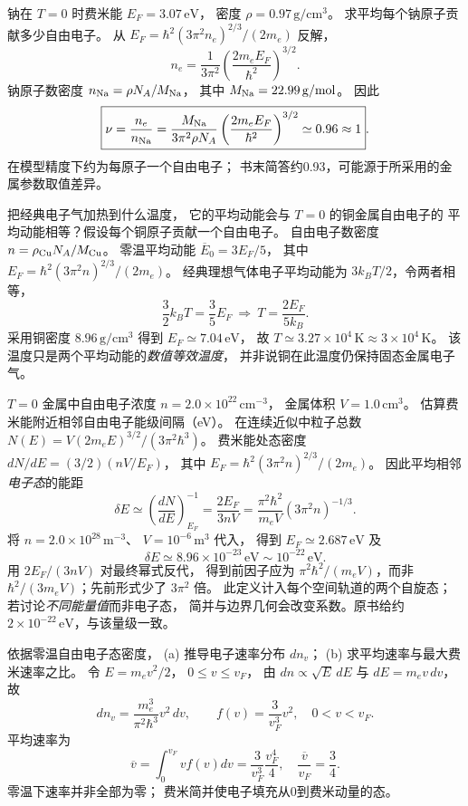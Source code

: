 钠在 $T=0$ 时费米能
$E_F=3.07\,\mathrm{eV}$，
密度 $\rho=0.97\,\mathrm{g/cm^3}$。
求平均每个钠原子贡献多少自由电子。
\exsolution
从
$E_F=\hbar^2(3\pi^2n_e)^{2/3}/(2m_e)$ 反解，
\[
 n_e=\frac1{3\pi^2}
 \left(\frac{2m_eE_F}{\hbar^2}\right)^{3/2}.
\]
钠原子数密度
$n_{\rm Na}=\rho N_A/M_{\rm Na}$，
其中 $M_{\rm Na}=22.99\,\mathrm{g/mol}$。
因此
\[
 \boxed{\nu=\frac{n_e}{n_{\rm Na}}
 =\frac{M_{\rm Na}}{3\pi^2\rho N_A}
 \left(\frac{2m_eE_F}{\hbar^2}\right)^{3/2}
 \simeq0.96\approx1}.
\]
\excheck 在模型精度下约为每原子一个自由电子；
书末简答约0.93，可能源于所采用的金属参数取值差异。

把经典电子气加热到什么温度，
它的平均动能会与 $T=0$ 的铜金属自由电子的
平均动能相等？假设每个铜原子贡献一个自由电子。
\exsolution
自由电子数密度
$n=\rho_{\rm Cu}N_A/M_{\rm Cu}$。
零温平均动能 $\overline E_0=3E_F/5$，
其中
$E_F=\hbar^2(3\pi^2n)^{2/3}/(2m_e)$。
经典理想气体电子平均动能为
$3k_BT/2$，令两者相等，
\[
 \frac32k_BT=\frac35E_F
 \ \Longrightarrow\
 \boxed{T=\frac{2E_F}{5k_B}}.
\]
采用铜密度 $8.96\,\mathrm{g/cm^3}$
得到 $E_F\simeq7.04\,\mathrm{eV}$，
故
$\boxed{T\simeq3.27\times10^4\,\mathrm K
 \approx3\times10^4\,\mathrm K}$。
\excheck 该温度只是两个平均动能的\emph{数值等效温度}，
并非说铜在此温度仍保持固态金属电子气。

$T=0$ 金属中自由电子浓度
$n=2.0\times10^{22}\,\mathrm{cm^{-3}}$，
金属体积 $V=1.0\,\mathrm{cm^3}$。
估算费米能附近相邻自由电子能级间隔（eV）。
\exsolution
在连续近似中粒子总数
$N(E)=V(2m_eE)^{3/2}/(3\pi^2\hbar^3)$。
费米能处态密度
$dN/dE=(3/2)(nV/E_F)$，
其中
$E_F=\hbar^2(3\pi^2n)^{2/3}/(2m_e)$。
因此平均相邻\emph{电子态}的能距
\[
 \boxed{\delta E\simeq
 \left(\frac{dN}{dE}\right)^{-1}_{E_F}
 =\frac{2E_F}{3nV}
 =\frac{\pi^2\hbar^2}{m_eV}(3\pi^2n)^{-1/3}}.
\]
将 $n=2.0\times10^{28}\,\mathrm{m^{-3}}$、
$V=10^{-6}\,\mathrm{m^3}$ 代入，
得到 $E_F\simeq2.687\,\mathrm{eV}$ 及
\[
\boxed{\delta E\simeq8.96\times10^{-23}\,\mathrm{eV}
\sim10^{-22}\,\mathrm{eV}}.
\]
\excheck 用 $2E_F/(3nV)$ 对最终幂式反代，
得到前因子应为 $\pi^2\hbar^2/(m_eV)$，而非
$\hbar^2/(3m_eV)$；先前形式少了 $3\pi^2$ 倍。
此定义计入每个空间轨道的两个自旋态；
若讨论\emph{不同能量值}而非电子态，
简并与边界几何会改变系数。原书给约
$2\times10^{-22}\,\mathrm{eV}$，与该量级一致。

依据零温自由电子态密度，
(a) 推导电子速率分布 $dn_v$；
(b) 求平均速率与最大费米速率之比。
\exsolution
令 $E=m_ev^2/2$，
$0\le v\le v_F$，
由 $dn\propto\sqrt E\,dE$ 与
$dE=m_ev\,dv$，故
\[
 \boxed{dn_v=\frac{m_e^3}{\pi^2\hbar^3}v^2\,dv},
 \qquad
 \boxed{f(v)=\frac3{v_F^3}v^2},
 \quad 0<v<v_F.
\]
平均速率为
\[
 \overline v=\int_0^{v_F}vf(v)dv
 =\frac{3}{v_F^3}\frac{v_F^4}{4},
 \quad \boxed{\frac{\overline v}{v_F}=\frac34}.
\]
\excheck 零温下速率并非全部为零；
费米简并使电子填充从0到费米动量的态。

